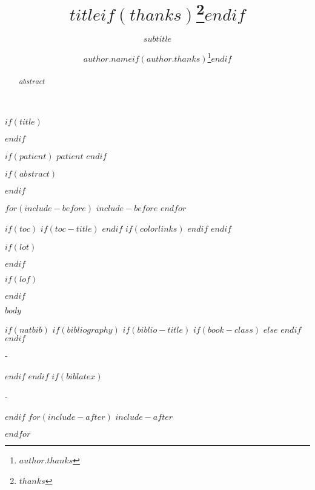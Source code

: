 \documentclass[%
numbers=noendperiod,
parskip=half,
bibliography=totoc,
$if(papersize)$
  $papersize$paper,
$endif$
$if(fontsize)$
  $fontsize$,
$endif$
$for(classoption)$$classoption$$sep$,$endfor$,
]{scrartcl}
\title{$title$$if(thanks)$\thanks{$thanks$}$endif$}
\subtitle{$subtitle$}
\author[$author.id$]{$author.name$$if(author.thanks)$\thanks{$author.thanks$}$endif$}
\affil[$affil.id$]{$affil.name$}
\date{} %
\newlength{\overhang}
\newenvironment{fullwidth}{%
  \blockmargin
  \begin{addmargin*}[0em]{-\overhang}%
}{%
  \end{addmargin*}%
  \unblockmargin
}
\begin{document}
$if(title)$
\maketitle
$endif$

$if(patient)$
\textbf{$patient$}
$endif$

$if(abstract)$
\begin{abstract}
$abstract$
\end{abstract}
$endif$

$for(include-before)$
$include-before$
$endfor$

$if(toc)$
$if(toc-title)$
\renewcommand*\contentsname{$toc-title$}
$endif$
{
$if(colorlinks)$
\hypersetup{linkcolor=$if(toccolor)$$toccolor$$else$$endif$}
$endif$
\setcounter{tocdepth}{$toc-depth$}
\tableofcontents
}
$endif$

$if(lot)$
\listoftables
$endif$

$if(lof)$
\listoffigures
$endif$

$body$

$if(natbib)$
$if(bibliography)$
$if(biblio-title)$
$if(book-class)$
\renewcommand\bibname{$biblio-title$}
$else$
\renewcommand\refname{$biblio-title$}
$endif$
$endif$
\begin{fullwidth}

\end{fullwidth}
$endif$
$endif$
$if(biblatex)$
\begin{fullwidth}
  \begin{multicols}{2}[\printbibheading]
    \renewcommand{\bibfont}{\small}
    \printbibliography[heading=none$if(biblio-title)$, title=$biblio-title$$endif$]
  \end{multicols}
\end{fullwidth}

$endif$
$for(include-after)$
$include-after$

$endfor$
\end{document}
